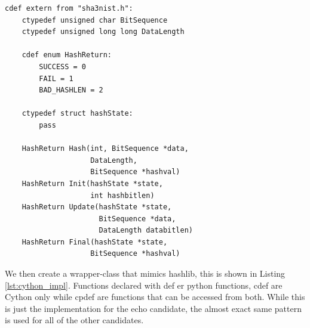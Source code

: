\documentclass[english,12pt,a4paper]{book}
\begin{document}
\begin{lstlisting}[label=lst:cython_header, caption=Cython header\, echo\_hash\_h.pxd]
cdef extern from "sha3nist.h":
    ctypedef unsigned char BitSequence
    ctypedef unsigned long long DataLength

    cdef enum HashReturn:
        SUCCESS = 0
        FAIL = 1
        BAD_HASHLEN = 2

    ctypedef struct hashState:
        pass

    HashReturn Hash(int, BitSequence *data, 
                    DataLength, 
                    BitSequence *hashval)
    HashReturn Init(hashState *state, 
                    int hashbitlen)
    HashReturn Update(hashState *state, 
                      BitSequence *data, 
                      DataLength databitlen)
    HashReturn Final(hashState *state, 
                    BitSequence *hashval)
\end{lstlisting}

We then create a wrapper-class that mimics hashlib, this is shown in Listing
\ref{lst:cython_impl}. Functions declared with def er python functions, cdef are
Cython only while cpdef are functions that can be accessed from both. While
this is just the implementation for the echo candidate, the almost exact same
pattern is used for all of the other candidates. 
\end{document}
